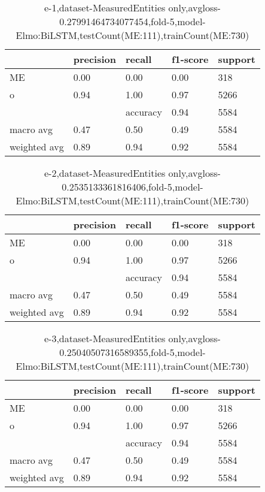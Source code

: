 \begin{table}[!ht] 
\centering
\caption{e-1,dataset-MeasuredEntities only,avgloss-0.27991464734077454,fold-5,model-Elmo:BiLSTM,testCount(ME:111),trainCount(ME:730)}\label{e-1data-meS.tsv}
\begin{tabularx}{300pt}{|X|X|X|X|X|}
\hline
&precision&recall&f1-score&support\\
\hline
ME&0.00&0.00&0.00&318\\
\hline
o&0.94&1.00&0.97&5266\\
\hline
&&accuracy&0.94&5584\\
\hline
macro avg&0.47&0.50&0.49&5584\\
\hline
weighted avg&0.89&0.94&0.92&5584\\
\hline
\end{tabularx}
\end{table}
\begin{table}[!ht] 
\centering
\caption{e-2,dataset-MeasuredEntities only,avgloss-0.2535133361816406,fold-5,model-Elmo:BiLSTM,testCount(ME:111),trainCount(ME:730)}\label{e-2data-meS.tsv}
\begin{tabularx}{300pt}{|X|X|X|X|X|}
\hline
&precision&recall&f1-score&support\\
\hline
ME&0.00&0.00&0.00&318\\
\hline
o&0.94&1.00&0.97&5266\\
\hline
&&accuracy&0.94&5584\\
\hline
macro avg&0.47&0.50&0.49&5584\\
\hline
weighted avg&0.89&0.94&0.92&5584\\
\hline
\end{tabularx}
\end{table}
\begin{table}[!ht] 
\centering
\caption{e-3,dataset-MeasuredEntities only,avgloss-0.25040507316589355,fold-5,model-Elmo:BiLSTM,testCount(ME:111),trainCount(ME:730)}\label{e-3data-meS.tsv}
\begin{tabularx}{300pt}{|X|X|X|X|X|}
\hline
&precision&recall&f1-score&support\\
\hline
ME&0.00&0.00&0.00&318\\
\hline
o&0.94&1.00&0.97&5266\\
\hline
&&accuracy&0.94&5584\\
\hline
macro avg&0.47&0.50&0.49&5584\\
\hline
weighted avg&0.89&0.94&0.92&5584\\
\hline
\end{tabularx}
\end{table}
